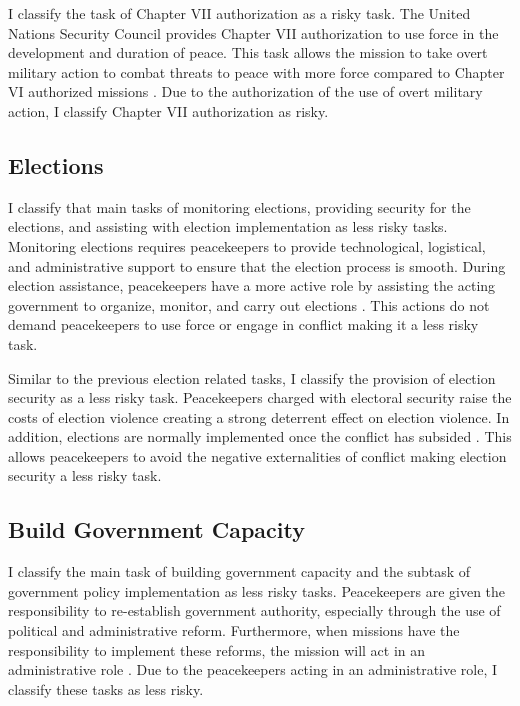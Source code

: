 I classify the task of Chapter VII authorization as a risky task. The United Nations Security Council provides Chapter VII authorization to use force in the development and duration of peace. This task allows the mission to take overt military action to combat threats to peace with more force compared to Chapter VI authorized missions \citep{PKO_Ox}. Due to the authorization of the use of overt military action, I classify Chapter VII authorization as risky. 

\subsection*{Elections}

I classify that main tasks of monitoring elections, providing security for the elections, and assisting with election implementation as less risky tasks. Monitoring elections requires peacekeepers to provide technological, logistical, and administrative support to ensure that the election process is smooth. During election assistance, peacekeepers have a more active role by assisting the acting government to organize, monitor, and carry out elections \citep{TAMM_Codebook}. This actions do not demand peacekeepers to use force or engage in conflict making it a less risky task.

Similar to the previous election related tasks, I classify the provision of election security as a less risky task. Peacekeepers charged with electoral security raise the costs of election violence creating a strong deterrent effect on election violence. In addition, elections are normally implemented once the conflict has subsided \citep{fjelde2021protecting}. This allows peacekeepers to avoid the negative externalities of conflict making election security a less risky task. 

\subsection*{Build Government Capacity}

I classify the main task of building government capacity and the subtask of government policy implementation as less risky tasks. Peacekeepers are given the responsibility to re-establish government authority, especially through the use of political and administrative reform. Furthermore, when missions have the responsibility to implement these reforms, the mission will act in an administrative role \citep{TAMM_Codebook}. Due to the peacekeepers acting in an administrative role, I classify these tasks as less risky. 

